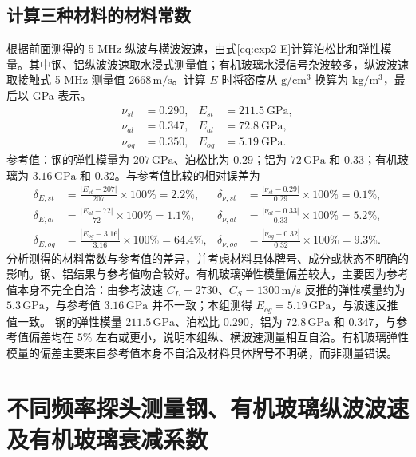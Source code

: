 \documentclass[UTF8,a4paper,12pt]{ctexart}
\numberwithin{equation}{section}
\begin{document}
\subsection{计算三种材料的材料常数}
根据前面测得的 5 MHz 纵波与横波波速，由式\eqref{eq:exp2-E}计算泊松比和弹性模量。其中钢、铝纵波波速取水浸式测量值；有机玻璃水浸信号杂波较多，纵波波速取接触式 5 MHz 测量值 $2668\,\mathrm{m/s}$。计算 $E$ 时将密度从 $\mathrm{g/cm^3}$ 换算为 $\mathrm{kg/m^3}$，最后以 GPa 表示。
\begin{subequations}
\begin{align}
  \nu_{st}&=0.290, & E_{st}&=211.5\ \mathrm{GPa},\\
  \nu_{al}&=0.347, & E_{al}&=72.8\ \mathrm{GPa},\\
  \nu_{og}&=0.350, & E_{og}&=5.19\ \mathrm{GPa}.
\end{align}
\end{subequations}
参考值：钢的弹性模量为 $207\,\mathrm{GPa}$、泊松比为 $0.29$；铝为 $72\,\mathrm{GPa}$ 和 $0.33$；有机玻璃为 $3.16\,\mathrm{GPa}$ 和 $0.32$。与参考值比较的相对误差为
\begin{subequations}
\begin{align}
  \delta_{E,st}&=\frac{|E_{st}-207|}{207}\times100\%=2.2\%, &
  \delta_{\nu,st}&=\frac{|\nu_{st}-0.29|}{0.29}\times100\%=0.1\%,\\
  \delta_{E,al}&=\frac{|E_{al}-72|}{72}\times100\%=1.1\%, &
  \delta_{\nu,al}&=\frac{|\nu_{al}-0.33|}{0.33}\times100\%=5.2\%,\\
  \delta_{E,og}&=\frac{|E_{og}-3.16|}{3.16}\times100\%=64.4\%, &
  \delta_{\nu,og}&=\frac{|\nu_{og}-0.32|}{0.32}\times100\%=9.3\%.
\end{align}
\end{subequations}
分析测得的材料常数与参考值的差异，并考虑材料具体牌号、成分或状态不明确的影响。钢、铝结果与参考值吻合较好。有机玻璃弹性模量偏差较大，主要因为参考值本身不完全自洽：由参考波速 $C_L=2730$、$C_S=1300\,\mathrm{m/s}$ 反推的弹性模量约为 $5.3\,\mathrm{GPa}$，与参考值 $3.16\,\mathrm{GPa}$ 并不一致；本组测得 $E_{og}=5.19\,\mathrm{GPa}$，与波速反推值一致。
钢的弹性模量 $211.5\,\mathrm{GPa}$、泊松比 $0.290$，铝为 $72.8\,\mathrm{GPa}$ 和 $0.347$，与参考值偏差均在 $5\%$ 左右或更小，说明本组纵、横波速测量相互自洽。有机玻璃弹性模量的偏差主要来自参考值本身不自洽及材料具体牌号不明确，而非测量错误。

\section{不同频率探头测量钢、有机玻璃纵波波速及有机玻璃衰减系数}
\end{document}
